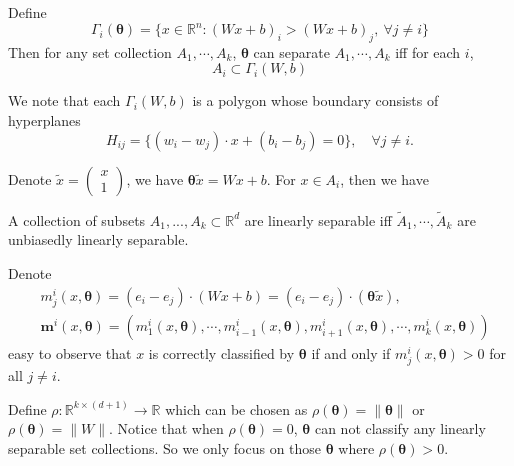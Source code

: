 \begin{lemma}{\label{Interplation}}
	Define
	\begin{equation}
	\label{Gammai}
	\Gamma_i(\bm\theta) = \{x\in\mathbb R^n: (Wx+b)_i > (Wx+b)_j,\ \forall j \neq i\}     
	\end{equation}
	Then for any set collection $A_1,\cdots,A_k$, $\bm\theta$ can separate $A_1,\cdots,A_k$ iff for each $i$, 
	\begin{equation}
	\label{AiGamma}
	A_i \subset \Gamma_i(W,b)  
	\end{equation}
\end{lemma}
We note that  each $\Gamma_i(W,b)  $ is a polygon whose boundary consists of hyperplanes
\begin{equation}
\label{Hij}
H_{ij}=\{(w_i-w_j)\cdot x+(b_i-b_j) = 0\}, \quad \forall j\neq i.
\end{equation}

Denote $\tilde x = 
\begin{pmatrix}
x\\
1
\end{pmatrix}
$, we have $\bm\theta \tilde{x} = Wx+b$. For $x\in A_i$, then we have

\begin{lemma}
	A collection of subsets $A_1,...,A_k\subset \mathbb{R}^d$ are
	linearly separable iff $\tilde A_1,\cdots,\tilde{A}_k$ are unbiasedly linearly separable.
\end{lemma}

Denote 
\begin{align}
&m_j^i(x,\bm\theta) = (e_i - e_j)\cdot (Wx+b) = (e_i - e_j)\cdot (\bm\theta \tilde{x}),\\
&\bm m^i(x,\bm\theta) = (m^i_1(x,\bm\theta),\cdots,m^i_{i-1}(x,\bm\theta),m^i_{i+1}(x,\bm\theta),\cdots,m^i_{k}(x,\bm\theta))
\end{align}
easy to observe that $x$ is correctly classified by $\bm\theta$ if and only if $m_j^i(x,\bm\theta) > 0$ for all $j\neq i$.

Define $\rho: \mathbb{R}^{k\times (d+1)} \rightarrow \mathbb{R}$ which can be chosen as $\rho(\bm\theta) = \|\bm\theta\|$ or  $\rho(\bm\theta) = \|W\|$. Notice that when $\rho(\bm\theta) = 0$, $\bm\theta$ can not classify any linearly separable set collections. So we only focus on those $\bm\theta$ where $\rho(\bm\theta) > 0$.


